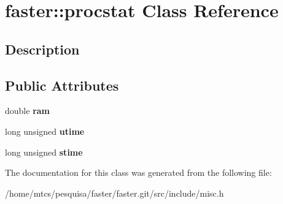 \hypertarget{classfaster_1_1procstat}{}\section{faster\+:\+:procstat Class Reference}
\label{classfaster_1_1procstat}


\subsection{Description}
\subsection*{Public Attributes}
\begin{DoxyCompactItemize}
\item 
\hypertarget{classfaster_1_1procstat_ad12d45d3f1d819e7613411835af89432}{}\label{classfaster_1_1procstat_ad12d45d3f1d819e7613411835af89432} 
double {\bfseries ram}
\item 
\hypertarget{classfaster_1_1procstat_a3033ca3dd5cf4fcca5d4f647149d21f7}{}\label{classfaster_1_1procstat_a3033ca3dd5cf4fcca5d4f647149d21f7} 
long unsigned {\bfseries utime}
\item 
\hypertarget{classfaster_1_1procstat_a8972e2ce24bf1961693edbd76344d1fd}{}\label{classfaster_1_1procstat_a8972e2ce24bf1961693edbd76344d1fd} 
long unsigned {\bfseries stime}
\end{DoxyCompactItemize}


The documentation for this class was generated from the following file\+:\begin{DoxyCompactItemize}
\item 
/home/mtcs/pesquisa/faster/faster.\+git/src/include/misc.\+h\end{DoxyCompactItemize}
